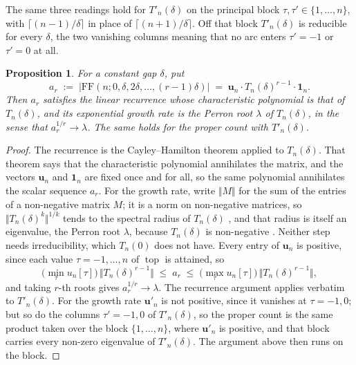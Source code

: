 \documentclass[11pt, a4paper, abstract=yes]{scrartcl}
\theoremstyle{definition}
\theoremstyle{remark}
\theoremstyle{plain}
\newtheorem{proposition}[definition]{Proposition}
\newcommand{\vek}[1]{\boldsymbol{#1}}
\newcommand{\tp}{\operatorname{top}}
\begin{document}
The same three readings hold for \(T'_n(\delta)\) on the principal block
\(\tau,\tau'\in\lbrace1,\dots,n\rbrace\), with \(\lceil(n-1)/\delta\rceil\) in place of
\(\lceil(n+1)/\delta\rceil\). Off that block \(T'_n(\delta)\) is reducible for every \(\delta\),
the two vanishing columns meaning that no arc enters \(\tau'=-1\) or \(\tau'=0\) at all.

\begin{proposition}
For a constant gap \(\delta\), put
\begin{equation}\label{eq:def-ar}
  a_r\;:=\;\lvert\mathrm{FF}(n;0,\delta,2\delta,\dots,(r-1)\delta)\rvert
  \;=\;\vek u_n\cdot T_n(\delta)^{r-1}\cdot\vek 1_n .
\end{equation}
Then \(a_r\) satisfies the linear recurrence whose characteristic polynomial is
that of \(T_n(\delta)\), and its exponential growth rate is the Perron root \(\lambda\) of
\(T_n(\delta)\), in the sense that \(a_r^{1/r}\to\lambda\). The same holds for the proper count with
\(T'_n(\delta)\).
\label{prop-recurrence}
\end{proposition}

\begin{proof}
The recurrence is the Cayley--Hamilton theorem applied to \(T_n(\delta)\). That theorem says that the
characteristic polynomial annihilates the matrix, and the vectors \(\vek u_n\) and \(\vek 1_n\) are
fixed once and for all, so the same polynomial annihilates the scalar sequence \(a_r\). For the
growth rate, write \(\Vert M\Vert\) for the sum of the entries of a non-negative matrix \(M\); it is
a norm on non-negative matrices, so \(\Vert T_n(\delta)^k\Vert^{1/k}\) tends to the spectral radius
of \(T_n(\delta)\) \autocite[Theorem 5.7.10]{HornJohnson2013}, and that radius is itself an
eigenvalue, the Perron root \(\lambda\), because \(T_n(\delta)\) is non-negative
\autocite[Theorem 8.3.1]{HornJohnson2013}. Neither step needs irreducibility, which \(T_n(0)\) does
not have. Every entry of
\(\vek u_n\) is positive, since each value \(\tau=-1,\dots,n\) of \(\tp\) is attained, so
\[
  \bigl(\min_\tau u_n[\tau]\bigr)\,\Vert T_n(\delta)^{r-1}\Vert\;\le\;a_r\;\le\;
  \bigl(\max_\tau u_n[\tau]\bigr)\,\Vert T_n(\delta)^{r-1}\Vert ,
\]
and taking \(r\)-th roots gives \(a_r^{1/r}\to\lambda\). The recurrence argument applies verbatim to
\(T'_n(\delta)\). For the growth rate \(\vek u'_n\) is not positive, since it vanishes at \(\tau=-1,0\);
but so do the columns \(\tau'=-1,0\) of \(T'_n(\delta)\), so the proper count is the same product
taken over the block \(\lbrace1,\dots,n\rbrace\), where \(\vek u'_n\) is positive, and that block
carries every non-zero eigenvalue of \(T'_n(\delta)\). The argument above then runs on the block.
\end{proof}
\end{document}

